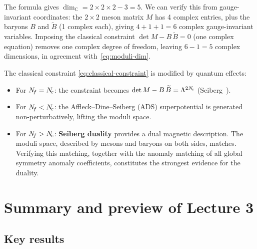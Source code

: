 \documentclass[11pt,a4paper]{article}
\begin{document}
\begin{remark}[Consistency check: $\Nf = \Nc = 2$]
The formula gives $\dim_{\mathbb{C}} = 2 \times 2 \times 2 - 3 = 5$.
We can verify this from gauge-invariant coordinates: the $2 \times 2$
meson matrix $M$ has 4 complex entries, plus the baryons $B$ and
$\widetilde{B}$ (1 complex each), giving $4 + 1 + 1 = 6$ complex
gauge-invariant variables.  Imposing the classical constraint
$\det M - B\,\widetilde{B} = 0$ (one complex equation) removes one
complex degree of freedom, leaving $6 - 1 = 5$ complex dimensions,
in agreement with~\eqref{eq:moduli-dim}.
\end{remark}

\begin{previewbox}[title={Preview: Quantum Modifications (Lecture 3)}]
The classical constraint \eqref{eq:classical-constraint} is modified by
quantum effects:
\begin{itemize}
  \item For $N_{\!f} = N_{\!c}$: the constraint becomes
    $\det M - B\,\widetilde{B} = \Lambda^{2N_{\!c}}$
    (Seiberg~\cite{Seiberg1995}).
  \item For $N_{\!f} < N_{\!c}$: the Affleck--Dine--Seiberg (ADS) superpotential
    is generated non-perturbatively, lifting the moduli space.
  \item For $N_{\!f} > N_{\!c}$: \textbf{Seiberg duality} provides a dual
    magnetic description.  The moduli space, described by mesons and
    baryons on both sides, matches.  Verifying this matching, together
    with the anomaly matching of all global symmetry anomaly
    coefficients, constitutes the strongest evidence for the duality.
\end{itemize}
\end{previewbox}


\section{Summary and preview of Lecture 3}
\label{sec:summary}

\subsection{Key results}
\end{document}
